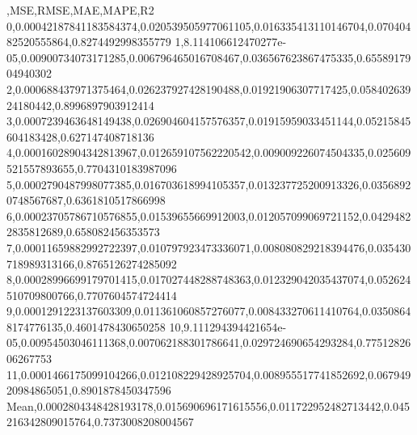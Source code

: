 ,MSE,RMSE,MAE,MAPE,R2
0,0.00042187841183584374,0.020539505977061105,0.016335413110146704,0.07040482520555864,0.8274492998355779
1,8.114106612470277e-05,0.00900734073171285,0.006796465016708467,0.036567623867475335,0.6558917904940302
2,0.000688437971375464,0.026237927428190488,0.01921906307717425,0.05840263924180442,0.8996897903912414
3,0.0007239463648149438,0.026904604157576357,0.01915959033451144,0.05215845604183428,0.627147408718136
4,0.00016028904342813967,0.012659107562220542,0.009009226074504335,0.025609521557893655,0.7704310183987096
5,0.0002790487998077385,0.016703618994105357,0.013237725200913326,0.03568920748567687,0.6361810517866998
6,0.00023705786710576855,0.01539655669912003,0.012057099069721152,0.04294822835812689,0.658082456353573
7,0.00011659882992722397,0.010797923473336071,0.008080829218394476,0.035430718989313166,0.8765126274285092
8,0.00028996699179701415,0.017027448288748363,0.012329042035437074,0.052624510709800766,0.7707604574724414
9,0.0001291223137603309,0.011361060857276077,0.008433270611410764,0.03508648174776135,0.4601478430650258
10,9.111294394421654e-05,0.00954503046111368,0.007062188301786641,0.029724690654293284,0.7751282606267753
11,0.0001466175099104266,0.012108229428925704,0.008955517741852692,0.06794920984865051,0.8901878450347596
Mean,0.0002804348428193178,0.015690696171615556,0.011722952482713442,0.045216342809015764,0.7373008208004567

